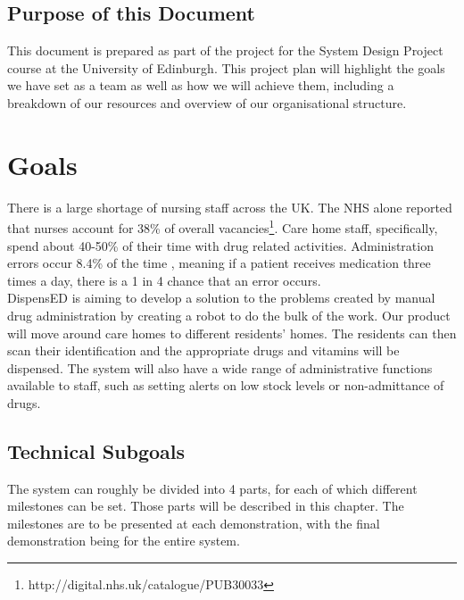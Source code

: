 \documentclass[a4paper,10pt,DIV10,openright,openbib]{scrreprt}
\begin{document}
\section{Purpose of this Document}
This document is prepared as part of the project for the System Design Project course
at the University of Edinburgh. This project plan will highlight the goals we
have set as a team as well as how we will achieve them, including a breakdown
of our resources and overview of our organisational structure.
\vspace{2cm}
{\let\clearpage\relax  \chapter{Goals}}

There is a large shortage of nursing staff across the UK. The NHS alone reported
that nurses account for 38\% of overall vacancies\footnote{http://digital.nhs.uk/catalogue/PUB30033}.
Care home staff, specifically, spend about 40-50\% of their time with drug
related activities. Administration errors occur 8.4\% of the time \cite{CHUMS},
meaning if a patient receives medication three times a day, there is a 1 in 4
chance that an error occurs.\\
DispensED is aiming to develop a solution to the problems created by manual drug
administration by creating a robot to do the bulk of the work. Our product will
move around care homes to different residents' homes. The residents can then
scan their identification and the appropriate drugs and vitamins will be
dispensed. The system will also have a wide range of administrative functions
available to staff, such as setting alerts on low stock levels or non-admittance of drugs.

\section{Technical Subgoals}
The system can roughly be divided into 4 parts, for each of which different milestones
can be set. Those parts will be described in this chapter. The milestones are to be
presented at each demonstration, with the final demonstration being for the entire
system.
\end{document}
